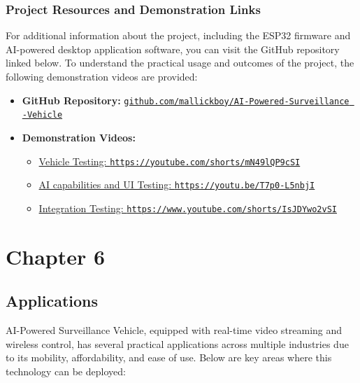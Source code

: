 \documentclass[12pt,a4paper]{report}
\begin{document}
\subsection{Project Resources and Demonstration Links}  
For additional information about the project, including the ESP32 firmware and AI-powered desktop application software, you can visit the GitHub repository linked below. To understand the practical usage and outcomes of the project, the following demonstration videos are provided:  
\begin{itemize}  
    \item \textbf{GitHub Repository:} \href{https://github.com/mallickboy/AI-Powered-Surveillance-Vehicle} {\texttt{github.com/mallickboy/AI-Powered-Surveillance -Vehicle} } 
    \item \textbf{Demonstration Videos:}  
    \begin{itemize}  
        \item \href{https://youtube.com/shorts/mN49lQP9cSI}{Vehicle Testing: \texttt{https://youtube.com/shorts/mN49lQP9cSI}}  
        \item \href{https://youtu.be/T7p0-L5nbjI}{AI capabilities and UI Testing: \texttt{https://youtu.be/T7p0-L5nbjI}}  
        \item \href{https://www.youtube.com/shorts/IsJDYwo2vSI}{Integration Testing: \texttt{https://www.youtube.com/shorts/IsJDYwo2vSI}}  
    \end{itemize}  
\end{itemize}


 







	{\vfill \chapter*{\centering \vfill Chapter 6 \vfill}\vfill}
	\thispagestyle{empty}
	\newpage
	\label{Applications}
	\section{Applications}

AI-Powered Surveillance Vehicle, equipped with real-time video streaming and wireless control, has several practical applications across multiple industries due to its mobility, affordability, and ease of use. Below are key areas where this technology can be deployed:
\end{document}
